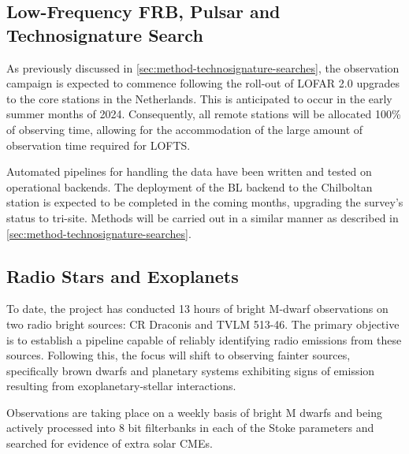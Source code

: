 \subsection{Low-Frequency FRB, Pulsar and Technosignature Search}

 As previously discussed in \cref{sec:method-technosignature-searches}, the observation campaign is expected to commence following the roll-out of LOFAR 2.0 upgrades to the core stations in the Netherlands. This is anticipated to occur in the early summer months of 2024. Consequently, all remote stations will be allocated 100\% of observing time, allowing for the accommodation of the large amount of observation time required for LOFTS. \ 

Automated pipelines for handling the data have been written and tested on operational backends. The deployment of the BL backend to the Chilboltan station is expected to be completed in the coming months, upgrading the survey's status to tri-site. Methods will be carried out in a similar manner as described in \cref{sec:method-technosignature-searches}.


\subsection{Radio Stars and Exoplanets}

To date, the project has conducted 13 hours of bright M-dwarf observations on two radio bright sources: CR Draconis and TVLM 513-46. The primary objective is to establish a pipeline capable of reliably identifying radio emissions from these sources. Following this, the focus will shift to observing fainter sources, specifically brown dwarfs and planetary systems exhibiting signs of emission resulting from exoplanetary-stellar interactions. \

Observations are taking place on a weekly basis of bright M dwarfs and being actively processed into 8 bit filterbanks in each of the Stoke parameters and searched for evidence of extra solar CMEs. 



